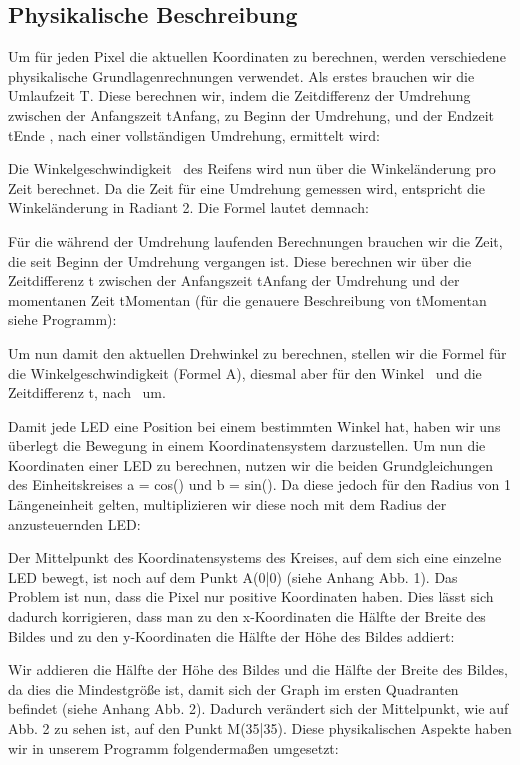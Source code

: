 \documentclass [a4paper, 11pt] {article}
\begin{document}
\subsection{Physikalische Beschreibung}
Um für jeden Pixel die aktuellen Koordinaten zu berechnen, werden verschiedene physikalische Grundlagenrechnungen verwendet.
Als erstes brauchen wir die Umlaufzeit T. Diese berechnen wir, indem die Zeitdifferenz der Umdrehung zwischen der Anfangszeit tAnfang, zu Beginn der Umdrehung, und der Endzeit tEnde , nach einer vollständigen Umdrehung, ermittelt wird:

Die Winkelgeschwindigkeit \textomega\ des Reifens wird nun über die Winkeländerung pro Zeit berechnet. Da die Zeit für eine Umdrehung gemessen wird, entspricht die Winkeländerung in Radiant 2\textpi. Die Formel lautet demnach:

Für die während der Umdrehung laufenden Berechnungen brauchen wir die Zeit, die seit Beginn der Umdrehung vergangen ist. Diese berechnen wir über die Zeitdifferenz \textDelta t zwischen der Anfangszeit tAnfang der Umdrehung und der momentanen Zeit tMomentan (für die genauere Beschreibung von tMomentan siehe Programm):

Um nun damit den aktuellen Drehwinkel zu berechnen, stellen wir die Formel für die Winkelgeschwindigkeit (Formel A), diesmal aber für den Winkel \textalpha\  und die Zeitdifferenz \textDelta t, nach \textalpha\  um.  

Damit jede LED eine Position bei einem bestimmten Winkel hat, haben wir uns überlegt die Bewegung in einem Koordinatensystem darzustellen. Um nun die Koordinaten einer LED zu berechnen, nutzen wir die beiden Grundgleichungen des Einheitskreises a = cos(\textalpha) und
b = sin(\textalpha). Da diese jedoch für den Radius von 1 Längeneinheit gelten, multiplizieren wir diese noch mit dem Radius der anzusteuernden LED:

Der Mittelpunkt des Koordinatensystems des Kreises, auf dem sich eine einzelne LED bewegt, ist noch auf dem Punkt A(0|0) (siehe Anhang Abb. 1). Das Problem ist nun, dass die Pixel nur positive Koordinaten haben. Dies lässt sich dadurch korrigieren, dass man zu den x-Koordinaten die Hälfte der Breite des Bildes und zu den y-Koordinaten die Hälfte der Höhe des Bildes addiert:

Wir addieren die Hälfte der Höhe des Bildes und die Hälfte der Breite des Bildes, da dies die Mindestgröße ist, damit sich der Graph im ersten Quadranten befindet (siehe Anhang
Abb. 2). Dadurch verändert sich der Mittelpunkt, wie auf Abb. 2 zu sehen ist, auf den Punkt M(35|35).
Diese physikalischen Aspekte haben wir in unserem Programm folgendermaßen umgesetzt:
\end{document}
